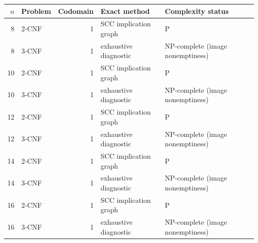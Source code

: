 \begin{tabular}{rlrll}
\toprule
$n$ & Problem & Codomain & Exact method & Complexity status \\
\midrule
8 & 2-CNF & 1 & SCC implication graph & P \\
8 & 3-CNF & 1 & exhaustive diagnostic & NP-complete (image nonemptiness) \\
10 & 2-CNF & 1 & SCC implication graph & P \\
10 & 3-CNF & 1 & exhaustive diagnostic & NP-complete (image nonemptiness) \\
12 & 2-CNF & 1 & SCC implication graph & P \\
12 & 3-CNF & 1 & exhaustive diagnostic & NP-complete (image nonemptiness) \\
14 & 2-CNF & 1 & SCC implication graph & P \\
14 & 3-CNF & 1 & exhaustive diagnostic & NP-complete (image nonemptiness) \\
16 & 2-CNF & 1 & SCC implication graph & P \\
16 & 3-CNF & 1 & exhaustive diagnostic & NP-complete (image nonemptiness) \\
\bottomrule
\end{tabular}